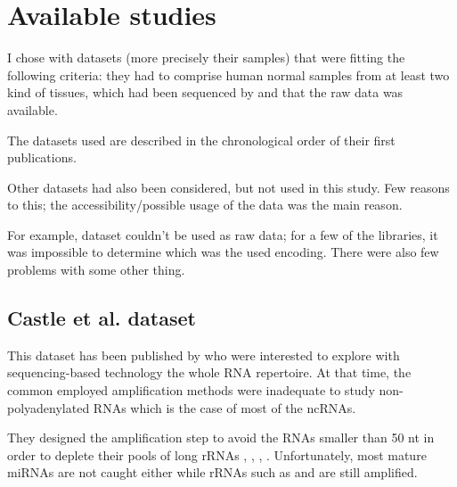 \section{Available studies}
\label{sec:Trans_AvailableStudies}

I chose with datasets (more precisely their samples) that were fitting the
following criteria: they had to comprise human normal samples from at least
two kind of tissues, which had been sequenced by \Rnaseq and that the raw data was
available.

The datasets used are described in the chronological order of their first publications.

Other datasets had also been considered, but not used in this study. Few reasons to
this; the accessibility/possible usage of the data was the main reason.

For example, \citet{Burge} dataset couldn't be used as raw data; for a few of the
libraries, it was impossible to determine which was the used encoding. There were
also few problems with some other thing.

\begin{comment}
\rough{Dataset: \begin{itemize}
        \item why?
        \item Main findings (particularly the ones that impact me)
        \item how they created it
\end{itemize}}
\end{comment}

\subsection{Castle et al. dataset}

This dataset has been published by \citet*{castleData} who were interested to explore
with sequencing-based technology the whole RNA repertoire. At that time, the common
employed amplification methods were inadequate to study non-polyadenylated
\glspl{RNA} which is the case of most of the \glspl{ncRNA}.

They designed the amplification step to avoid the \glspl{RNA}
smaller than 50 \gls{nt} in order to deplete their pools of long
\glspl{rRNA} , , ,
. Unfortunately, most mature \glspl{miRNA} are not caught either while
\glspl{rRNA} such as  and  are still amplified.

